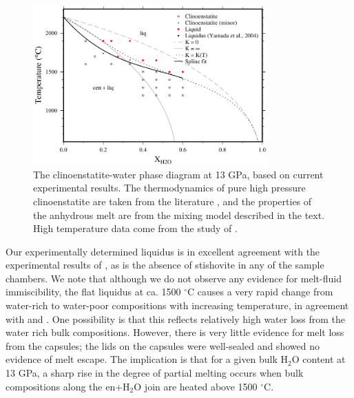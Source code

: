\documentclass[review]{elsarticle}
\begin{document}
\begin{figure}[ht!]
  \centering
      \includegraphics[width=0.8\textwidth]{figures/enstatite}
  \caption{The clinoenstatite-water phase diagram at 13 GPa, based on current experimental results. The thermodynamics of pure high pressure clinoenstatite are taken from the literature \citep{SLB2011}, and the properties of the anhydrous melt are from the mixing model described in the text. High temperature data come from the study of \cite{NDMPMF2016}.}
  \label{fig:eoH}
\end{figure}

Our experimentally determined liquidus is in excellent agreement with the experimental results of \cite{YII2004}, as is the absence of stishovite in any of the sample chambers. We note that although we do not observe any evidence for melt-fluid immiscibility, the flat liquidus at ca. 1500 $^{\circ}$C causes a very rapid change from water-rich to water-poor compositions with increasing temperature, in agreement with \cite{Inoue1994} and \cite{YII2004}. One possibility is that this reflects relatively high water loss from the water rich bulk compositions. However, there is very little evidence for melt loss from the capsules; the lids on the capsules were well-sealed and showed no evidence of melt escape. The implication is that for a given bulk H$_2$O content at 13 GPa, a sharp rise in the degree of partial melting occurs when bulk compositions along the en+H$_2$O join are heated above 1500 $^{\circ}$C.

\clearpage
\end{document}
